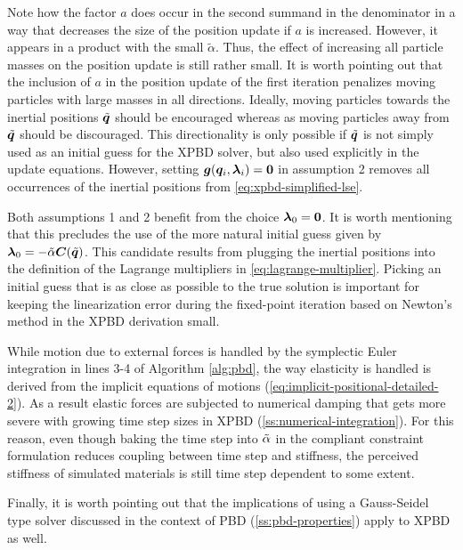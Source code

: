 \noindent Note how the factor $a$ does occur in the second summand in the denominator in a way that decreases the size of the position update
if $a$ is increased. However, it appears in a product with the small $\tilde{\alpha}$. Thus, the effect of increasing all particle masses on
the position update is still rather small. It is worth pointing out that the inclusion of $a$ in the position update of the first iteration
penalizes moving particles with large masses in all directions. Ideally, moving particles towards the inertial positions $\tilde{\bm{q}}$
should be encouraged whereas as moving particles away from $\tilde{\bm{q}}$ should be discouraged. This directionality is only possible if
$\tilde{\bm{q}}$ is not simply used as an initial guess for the XPBD solver, but also used explicitly in the update equations. However, setting
$\bm{g}(\bm{q}_i, \bm{\lambda}_i) = \bm{0}$ in assumption 2 removes all occurrences of the inertial positions from \autoref{eq:xpbd-simplified-lse}.

Both assumptions 1 and 2 benefit from the choice $\bm{\lambda}_0 = \bm{0}$. It is worth mentioning that this precludes the use of the more natural
initial guess given by $\bm{\lambda}_0 = -\tilde{\mathbf{\alpha}} \bm{C}(\tilde{\bm{q}})$. This candidate results from plugging the 
inertial positions into the
definition of the Lagrange multipliers in \autoref{eq:lagrange-multiplier}. Picking an initial guess that is as close as possible to the true
solution is important for keeping the linearization error during the fixed-point iteration based on Newton's method in the XPBD derivation 
small. 

While motion due to external forces is handled by the symplectic Euler integration in lines 3-4 of Algorithm \ref{alg:pbd}, the way 
elasticity is handled is derived from the implicit equations of motions (\cref{eq:implicit-positional-detailed-2}). As a result 
elastic forces are subjected to numerical damping that gets more severe with growing time step sizes in XPBD (\cref{ss:numerical-integration}). 
For this reason, even though baking the time step into $\tilde{\mathbf{\alpha}}$ in the compliant constraint formulation reduces coupling 
between time step and stiffness, the perceived stiffness of simulated materials is still time step dependent to some extent.

Finally, it is worth pointing out that the implications of using a Gauss-Seidel type solver discussed in the context of PBD 
(\cref{ss:pbd-properties}) apply to XPBD as well.

